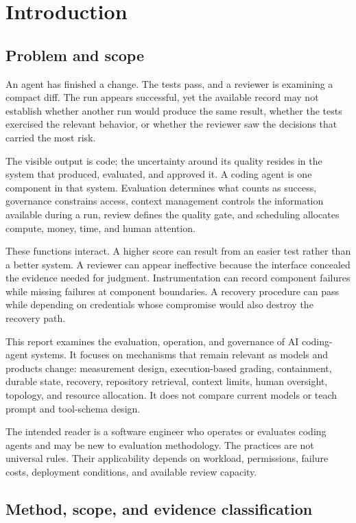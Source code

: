 \chapter*{Introduction}
\section{Problem and scope}\label{problem-and-scope}

An agent has finished a change. The tests pass, and a reviewer is examining a compact diff. The run appears successful, yet the available record may not establish whether another run would produce the same result, whether the tests exercised the relevant behavior, or whether the reviewer saw the decisions that carried the most risk.

The visible output is code; the uncertainty around its quality resides in the system that produced, evaluated, and approved it. A coding agent is one component in that system. Evaluation determines what counts as success, governance constrains access, context management controls the information available during a run, review defines the quality gate, and scheduling allocates compute, money, time, and human attention.

These functions interact. A higher score can result from an easier test rather than a better system. A reviewer can appear ineffective because the interface concealed the evidence needed for judgment. Instrumentation can record component failures while missing failures at component boundaries. A recovery procedure can pass while depending on credentials whose compromise would also destroy the recovery path.

This report examines the evaluation, operation, and governance of AI coding-agent systems. It focuses on mechanisms that remain relevant as models and products change: measurement design, execution-based grading, containment, durable state, recovery, repository retrieval, context limits, human oversight, topology, and resource allocation. It does not compare current models or teach prompt and tool-schema design.

The intended reader is a software engineer who operates or evaluates coding agents and may be new to evaluation methodology. The practices are not universal rules. Their applicability depends on workload, permissions, failure costs, deployment conditions, and available review capacity.

\section{Method, scope, and evidence classification}\label{method-scope-and-evidence-classification}

